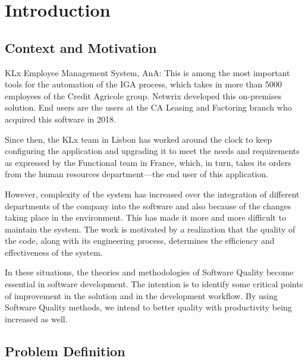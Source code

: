 
%

\chapter{Introduction}
\label{cha:introduction}


\section{Context and Motivation}
    
KLx Employee Management System, AnA: This is among the most important tools for the automation of the IGA process, which takes in more than 5000 employees of the Credit Agricole group. Netwrix developed this on-premises solution. End users are the users at the CA Leasing and Factoring branch who acquired this software in 2018.

Since then, the KLx team in Lisbon has worked around the clock to keep configuring the application and upgrading it to meet the needs and requirements as expressed by the Functional team in France, which, in turn, takes its orders from the human resources department—the end user of this application.

However, complexity of the system has increased over the integration of different departments of the company into the software and also because of the changes taking place in the environment. This has made it more and more difficult to maintain the system. The work is motivated by a realization that the quality of the code, along with its engineering process, determines the efficiency and effectiveness of the system.

In these situations, the theories and methodologies of Software Quality become essential in software development. The intention is to identify some critical points of improvement in the solution and in the development workflow. By using Software Quality methods, we intend to better quality with productivity being increased as well.

\section{Problem Definition}

